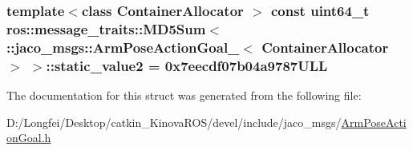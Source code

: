 \subsubsection[{\texorpdfstring{static\+\_\+value2}{static_value2}}]{\setlength{\rightskip}{0pt plus 5cm}template$<$class Container\+Allocator $>$ const uint64\+\_\+t ros\+::message\+\_\+traits\+::\+M\+D5\+Sum$<$ \+::{\bf jaco\+\_\+msgs\+::\+Arm\+Pose\+Action\+Goal\+\_\+}$<$ Container\+Allocator $>$ $>$\+::static\+\_\+value2 = 0x7eecdf07b04a9787\+U\+LL\hspace{0.3cm}{\ttfamily [static]}}\hypertarget{structros_1_1message__traits_1_1MD5Sum_3_01_1_1jaco__msgs_1_1ArmPoseActionGoal___3_01ContainerAllocator_01_4_01_4_aae8b430e78771f822c7695b3554c95d1}{}\label{structros_1_1message__traits_1_1MD5Sum_3_01_1_1jaco__msgs_1_1ArmPoseActionGoal___3_01ContainerAllocator_01_4_01_4_aae8b430e78771f822c7695b3554c95d1}


The documentation for this struct was generated from the following file\+:\begin{DoxyCompactItemize}
\item 
D\+:/\+Longfei/\+Desktop/catkin\+\_\+\+Kinova\+R\+O\+S/devel/include/jaco\+\_\+msgs/\hyperlink{ArmPoseActionGoal_8h}{Arm\+Pose\+Action\+Goal.\+h}\end{DoxyCompactItemize}
